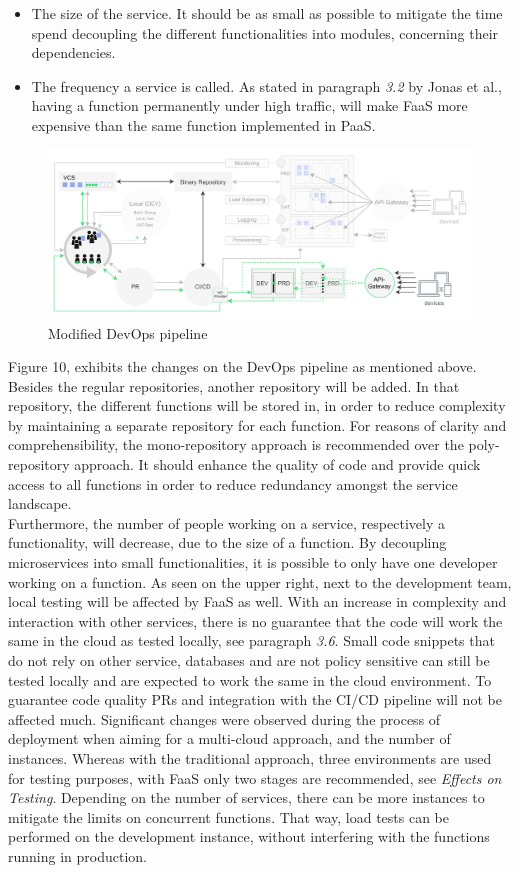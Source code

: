 \documentclass[a4paper,twoside,11pt, pagesize]{scrartcl}
\begin{document}
\begin{spacing}{1.2}
\begin{itemize}
  \item[2.] The size of the service. It should be as small as possible to mitigate the time spend decoupling the different functionalities into modules, concerning their dependencies.
  \item[3.] The frequency a service is called. As stated in paragraph \textit{3.2} by Jonas et al., having a function permanently under high traffic, will make FaaS more expensive than the same function implemented in PaaS.
\end{itemize}
\begin{figure}[H]
\label{fig:devopsModified}
\centering
\includegraphics[width=1\textwidth]{devopsModified}
\caption{Modified DevOps pipeline}
\end{figure}
Figure 10, exhibits the changes on the DevOps pipeline as mentioned above. Besides the regular repositories, another repository will be added. In that repository, the different functions will be stored in, in order to reduce complexity by maintaining a separate repository for each function. For reasons of clarity and comprehensibility, the mono-repository approach is recommended over the poly-repository approach. It should enhance the quality of code and provide quick access to all functions in order to reduce redundancy amongst the service landscape. \\Furthermore, the number of people working on a service, respectively a functionality, will decrease, due to the size of a function. By decoupling microservices into small functionalities, it is possible to only have one developer working on a function. As seen on the upper right, next to the development team, local testing will be affected by FaaS as well. With an increase in complexity and interaction with other services, there is no guarantee that the code will work the same in the cloud as tested locally, see paragraph \textit{3.6}. Small code snippets that do not rely on other service, databases and are not policy sensitive can still be tested locally and are expected to work the same in the cloud environment. To guarantee code quality PRs and integration with the CI/CD pipeline will not be affected much. Significant changes were observed during the process of deployment when aiming for a multi-cloud approach, and the number of instances. Whereas with the traditional approach, three environments are used for testing purposes, with FaaS only two stages are recommended, see \textit{Effects on Testing}. Depending on the number of services, there can be more instances to mitigate the limits on concurrent functions. That way, load tests can be performed on the development instance, without interfering with the functions running in production. 
\newpage

\end{spacing}
\end{document}
